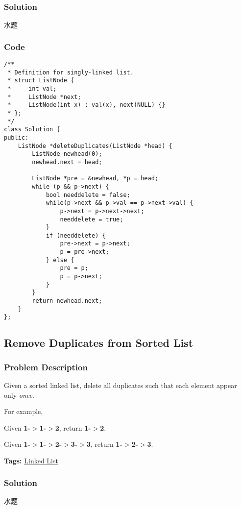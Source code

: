\documentclass{article}
\begin{document}
\begin{CJK*}{UTF8}{gkai}
\subsubsection*{Solution}
水题

\subsubsection*{Code}
\begin{lstlisting}
/**
 * Definition for singly-linked list.
 * struct ListNode {
 *     int val;
 *     ListNode *next;
 *     ListNode(int x) : val(x), next(NULL) {}
 * };
 */
class Solution {
public:
    ListNode *deleteDuplicates(ListNode *head) {
        ListNode newhead(0);
        newhead.next = head;
        
        ListNode *pre = &newhead, *p = head;
        while (p && p->next) {
            bool needdelete = false;
            while(p->next && p->val == p->next->val) {
                p->next = p->next->next;
                needdelete = true;
            }
            if (needdelete) {
                pre->next = p->next;
                p = pre->next;
            } else {
                pre = p;
                p = p->next;
            }
        }
        return newhead.next;
    }
}; 
\end{lstlisting}


\subsection{ Remove Duplicates from Sorted List }
\label{ Remove Duplicates from Sorted List }

\subsubsection*{Problem Description}
Given a sorted linked list, delete all duplicates such that each element appear only \emph{once}.

For example,


Given \textbf{1-$>$1-$>$2}, return \textbf{1-$>$2}.


Given \textbf{1-$>$1-$>$2-$>$3-$>$3}, return \textbf{1-$>$2-$>$3}.


\textbf{Tags: }
\hyperref[ Linked List ]{ Linked List }



\subsubsection*{Solution}
水题


\end{CJK*}
\end{document}
